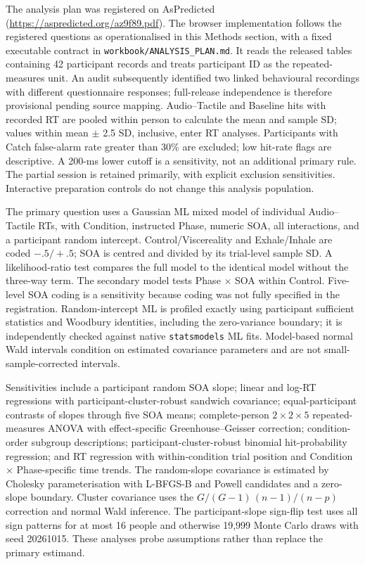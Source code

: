 The analysis plan was registered on AsPredicted (\url{https://aspredicted.org/az9f89.pdf}). The browser implementation follows the registered questions as operationalised in this Methods section, with a fixed executable contract in \texttt{workbook/ANALYSIS\_PLAN.md}. It reads the released tables containing 42 participant records and treats participant ID as the repeated-measures unit. An audit subsequently identified two linked behavioural recordings with different questionnaire responses; full-release independence is therefore provisional pending source mapping. Audio--Tactile and Baseline hits with recorded RT are pooled within person to calculate the mean and sample SD; values within mean $\pm$ 2.5 SD, inclusive, enter RT analyses. Participants with Catch false-alarm rate greater than 30\% are excluded; low hit-rate flags are descriptive. A 200-ms lower cutoff is a sensitivity, not an additional primary rule. The partial session is retained primarily, with explicit exclusion sensitivities. Interactive preparation controls do not change this analysis population.

The primary question uses a Gaussian ML mixed model of individual Audio--Tactile RTs, with Condition, instructed Phase, numeric SOA, all interactions, and a participant random intercept. Control/Viscereality and Exhale/Inhale are coded $-.5/+.5$; SOA is centred and divided by its trial-level sample SD. A likelihood-ratio test compares the full model to the identical model without the three-way term. The secondary model tests Phase $\times$ SOA within Control. Five-level SOA coding is a sensitivity because coding was not fully specified in the registration. Random-intercept ML is profiled exactly using participant sufficient statistics and Woodbury identities, including the zero-variance boundary; it is independently checked against native \texttt{statsmodels} ML fits. Model-based normal Wald intervals condition on estimated covariance parameters and are not small-sample-corrected intervals.

Sensitivities include a participant random SOA slope; linear and log-RT regressions with participant-cluster-robust sandwich covariance; equal-participant contrasts of slopes through five SOA means; complete-person $2\times2\times5$ repeated-measures ANOVA with effect-specific Greenhouse--Geisser correction; condition-order subgroup descriptions; participant-cluster-robust binomial hit-probability regression; and RT regression with within-condition trial position and Condition $\times$ Phase-specific time trends. The random-slope covariance is estimated by Cholesky parameterisation with L-BFGS-B and Powell candidates and a zero-slope boundary. Cluster covariance uses the $G/(G-1)\,(n-1)/(n-p)$ correction and normal Wald inference. The participant-slope sign-flip test uses all sign patterns for at most 16 people and otherwise 19{,}999 Monte Carlo draws with seed 20261015. These analyses probe assumptions rather than replace the primary estimand.

